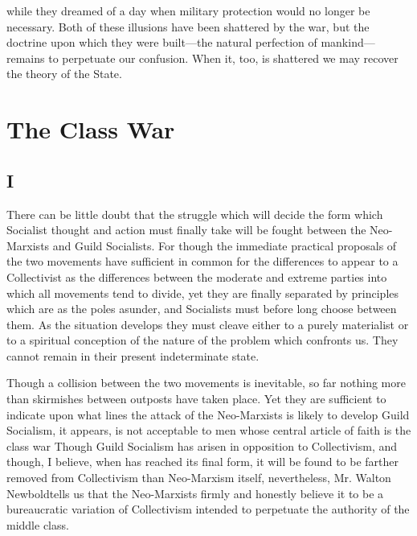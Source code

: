 \documentclass{book}
\begin{document}
while they dreamed of a day when military protection would no longer be necessary. Both of these illusions have been shattered by the war, but the doctrine upon which they were built—the natural perfection of mankind—remains to perpetuate our confusion. When it, too, is shattered we may recover the theory of the State.

\chapter{The Class War}
\label{chapter-6}
\section{I}
There can be little doubt that the struggle which will decide the form which Socialist thought and action must finally take will be fought between the Neo-Marxists and Guild Socialists. For though the immediate practical proposals of the two movements have sufficient in common for the differences to appear to a Collectivist as the differences between the moderate and extreme parties into which all movements tend to divide, yet they are finally separated by principles which are as the poles asunder, and Socialists must before long choose between them. As the situation develops they must cleave either to a purely materialist or to a spiritual conception of the nature of the problem which confronts us. They cannot remain in their present indeterminate state.

Though a collision between the two movements is inevitable, so far nothing more than skirmishes between outposts have taken place. Yet they are sufficient to indicate upon what lines the attack of the Neo-Marxists is likely to develop Guild Socialism, it appears, is not acceptable to men whose central article of faith is the class war Though Guild Socialism has arisen in opposition to Collectivism, and though, I believe, when has reached its final form, it will be found to be farther removed from Collectivism than Neo-Marxism itself, nevertheless, Mr. Walton Newbold\footnotemark[1] tells us that the Neo-Marxists firmly and honestly believe it to be a bureaucratic variation of Collectivism intended to perpetuate the authority of the middle class.
\end{document}
